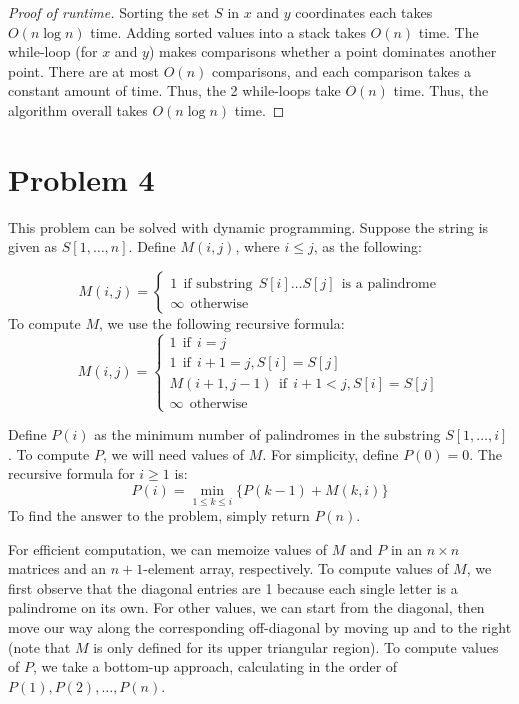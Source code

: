 \documentclass{article}
\begin{document}
\begin{proof}[Proof of runtime]
Sorting the set $S$ in $x$ and $y$ coordinates each takes $O(n \log n)$ time. Adding sorted values into a stack takes $O(n)$ time. The while-loop (for $x$ and $y$) makes comparisons whether a point dominates another point. There are at most $O(n)$ comparisons, and each comparison takes a constant amount of time. Thus, the 2 while-loops take $O(n)$ time. Thus, the algorithm overall takes $O(n \log n)$ time.
\end{proof}

\pagebreak

\section*{Problem 4}
This problem can be solved with dynamic programming. Suppose the string is given as $S[1,\dots,n]$. Define $M(i,j)$, where $i\leq j$, as the following:

$$M(i,j) = \begin{cases}
1 \ \ \text{if substring} \ \ S[i]\dots S[j] \ \ \text{is a palindrome} \\
\infty \ \ \text{otherwise}
\end{cases}$$
To compute $M$, we use the following recursive formula:
$$M(i,j) = \begin{cases}
1 \ \ \text{if} \ \ i=j\\
1 \ \ \text{if} \ \ i+1=j, S[i]=S[j] \\
M(i+1, j-1) \ \ \text{if} \ \ i+1<j,  S[i]=S[j] \\
\infty \ \ \text{otherwise}
\end{cases}$$

Define $P(i)$ as the minimum number of palindromes in the substring $S[1,\dots,i]$. To compute $P$, we will need values of $M$. For simplicity, define $P(0)=0$. The recursive formula for $i\geq 1$ is:
$$P(i) = \min_{1\leq k\leq i} \{P(k-1) + M(k,i)  \}$$
To find the answer to the problem, simply return $P(n)$.

For efficient computation, we can memoize values of $M$ and $P$ in an $n\times n$ matrices and an $n+1$-element array, respectively. To compute values of $M$, we first observe that the diagonal entries are 1 because each single letter is a palindrome on its own. For other values, we can start from the diagonal, then move our way along the corresponding off-diagonal by moving up and to the right (note that $M$ is only defined for its upper triangular region). To compute values of $P$, we take a bottom-up approach, calculating in the order of $P(1), P(2), \dots, P(n)$. 
\end{document}
